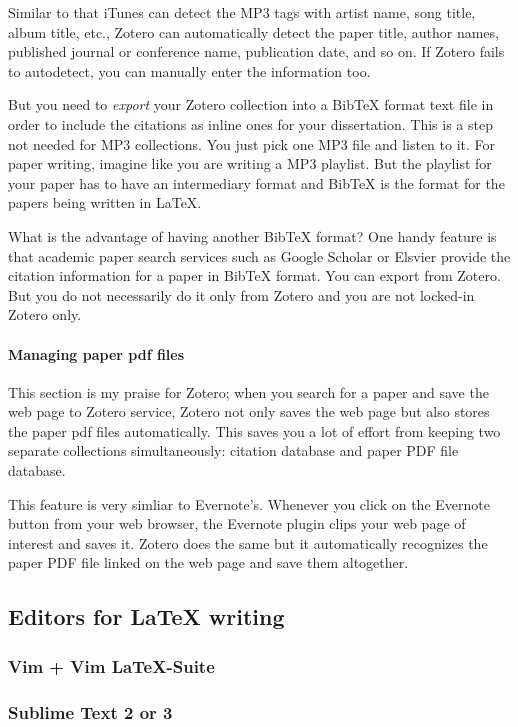 \documentclass[11pt]{article}
\begin{document}
Similar to that iTunes can detect the MP3 tags with artist name, song
title, album title, etc., Zotero can automatically detect the paper
title, author names, published journal or conference name, publication
date, and so on. If Zotero fails to autodetect, you can manually enter
the information too.

But you need to \emph{export} your Zotero collection into a BibTeX format
text file in order to include the citations as inline ones for your
dissertation. This is a step not needed for MP3 collections. You just pick one
MP3 file and listen to it. For paper writing, imagine like you are writing a
MP3 playlist. But the playlist for your paper has to have an intermediary
format and BibTeX is the format for the papers being written in LaTeX.

What is the advantage of having another BibTeX format? One handy feature is
that academic paper search services such as Google Scholar or Elsvier provide
the citation information for a paper in BibTeX format. You can export from
Zotero. But you do not necessarily do it only from Zotero and you are not
locked-in Zotero only. 

\paragraph{Managing paper pdf files}
This section is my praise for Zotero; when you search for a paper and
save the web page to Zotero service, Zotero not only saves the web page
but also stores the paper pdf files automatically. This saves you a lot
of effort from keeping two separate collections simultaneously: citation
database and paper PDF file database.

This feature is very simliar to Evernote's. Whenever you click on the Evernote
button from your web browser, the Evernote plugin clips your web page of
interest and saves it. Zotero does the same but it automatically recognizes
the paper PDF file linked on the web page and save them altogether.

\subsection{Editors for LaTeX writing}

\subsubsection{Vim + Vim LaTeX-Suite}

\subsubsection{Sublime Text 2 or 3}
\end{document}
